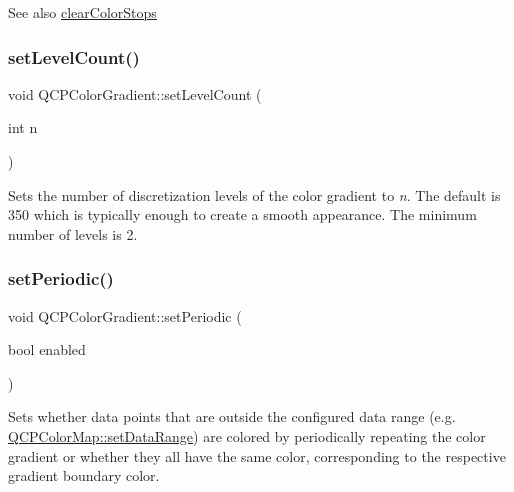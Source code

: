 \begin{DoxySeeAlso}{See also}
\hyperlink{class_q_c_p_color_gradient_a939213e85f0d1279519d555c5fcfb6ad}{clear\+Color\+Stops} 
\end{DoxySeeAlso}
\mbox{\label{class_q_c_p_color_gradient_a18da587eb4f7fc788ea28ba15b6a12de}} 
\subsubsection{\texorpdfstring{set\+Level\+Count()}{setLevelCount()}}
{\footnotesize\ttfamily void Q\+C\+P\+Color\+Gradient\+::set\+Level\+Count (\begin{DoxyParamCaption}\item[{int}]{n }\end{DoxyParamCaption})}

Sets the number of discretization levels of the color gradient to {\itshape n}. The default is 350 which is typically enough to create a smooth appearance. The minimum number of levels is 2.

 \mbox{\label{class_q_c_p_color_gradient_a39d6448155fc00a219f239220d14bb39}} 
\subsubsection{\texorpdfstring{set\+Periodic()}{setPeriodic()}}
{\footnotesize\ttfamily void Q\+C\+P\+Color\+Gradient\+::set\+Periodic (\begin{DoxyParamCaption}\item[{bool}]{enabled }\end{DoxyParamCaption})}

Sets whether data points that are outside the configured data range (e.\+g. \hyperlink{class_q_c_p_color_map_a980b42837821159786a85b4b7dcb8774}{Q\+C\+P\+Color\+Map\+::set\+Data\+Range}) are colored by periodically repeating the color gradient or whether they all have the same color, corresponding to the respective gradient boundary color.



